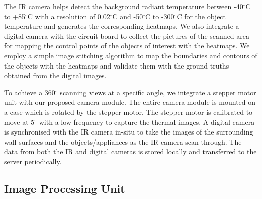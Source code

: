 The IR camera helps detect the background radiant temperature between -40$^{\circ}$C to +85$^{\circ}$C with a resolution of 0.02$^{\circ}$C and -50$^{\circ}$C to -300$^{\circ}$C for the object temperature and generates the corresponding heatmaps. We also integrate a digital camera with the circuit board to collect the  pictures of the scanned area for mapping the control points of the objects of interest with the heatmaps. We employ a simple image stitching algorithm to map the boundaries and contours of the objects with the heatmaps and validate them with the ground truths obtained from the digital images. 

	
To achieve a 360$^{\circ}$ scanning views at a specific angle, we integrate a stepper motor unit with our proposed camera module. The entire camera module is mounted on a case which is rotated by the stepper motor. The stepper motor is calibrated to move at 5$^{\circ}$ with a low frequency to capture the thermal images. A digital camera is synchronised with the IR camera in-situ to take the images of the surrounding wall surfaces and the objects/appliances as the IR camera scan through. The data from both the IR and digital cameras is stored locally and transferred to the server periodically.
	
\subsection{Image Processing Unit}
\label{sec:imageprocessing}




%
%

